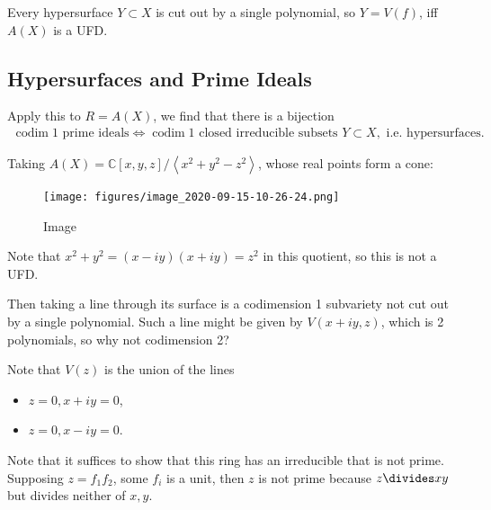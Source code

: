 \begin{corollary}[?]

Every hypersurface \(Y\subset X\) is cut out by a single polynomial, so
\(Y=V(f)\), iff \(A(X)\) is a UFD.

\end{corollary}

\hypertarget{hypersurfaces-and-prime-ideals}{%
\subsection{Hypersurfaces and Prime
Ideals}\label{hypersurfaces-and-prime-ideals}}

\begin{example}

Apply this to \(R=A(X)\), we find that there is a bijection
\begin{align*}  
\operatorname{codim}1 \text{ prime ideals}
\iff 
\operatorname{codim}1 \text{ closed irreducible subsets }Y\subset X,\text{ i.e. hypersurfaces}
.\end{align*}

Taking
\(A(X) = {\mathbb{C}}[x,y,z]/\left\langle{x^2+y^2-z^2}\right\rangle\),
whose real points form a cone:

\begin{figure}
\centering
\texttt{[image: figures/image\_2020-09-15-10-26-24.png]}
\caption{Image}
\end{figure}

Note that \(x^2 + y^2 = (x-iy)(x+iy) = z^2\) in this quotient, so this
is not a UFD.

Then taking a line through its surface is a codimension 1 subvariety not
cut out by a single polynomial. Such a line might be given by
\(V(x + iy, z)\), which is 2 polynomials, so why not codimension 2?

Note that \(V(z)\) is the union of the lines

\begin{itemize}
\tightlist
\item
  \(z = 0, x + iy= 0\),
\item
  \(z=0, x - iy = 0\).
\end{itemize}

Note that it suffices to show that this ring has an irreducible that is
not prime. Supposing \(z = f_1 f_2\), some \(f_i\) is a unit, then \(z\)
is not prime because \(z\divides xy\) but divides neither of \(x,y\).

\end{example}

